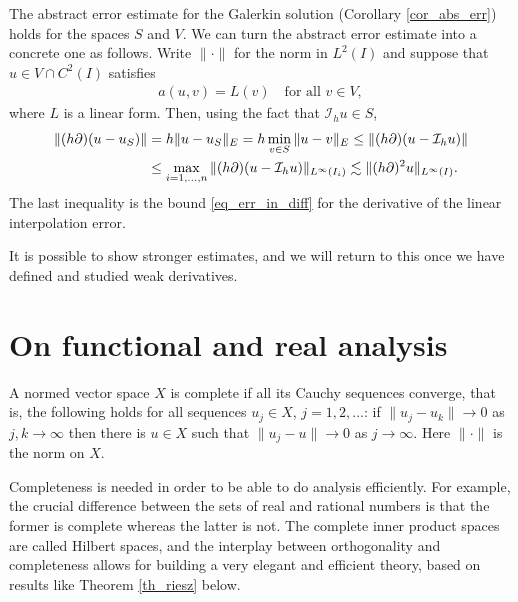 \documentclass[12pt,oneside,final]{amsart}
\def\I{\mathcal I}
\begin{document}
The abstract error estimate for the Galerkin solution (Corollary \ref{cor_abs_err}) holds for the spaces $S$ and $V$. 
We can turn the abstract error estimate into a concrete one as follows. Write $\|\cdot\|$ for the norm in $L^2(I)$ and suppose that $u \in V \cap C^2(I)$ satisfies
    \begin{align*}
a(u, v) = L(v) \quad \text{for all $v \in V$},
    \end{align*}
where $L$ is a linear form.
Then, using the fact that $\I_h u \in S$,
    \begin{align}\label{eq_err_peek}
\|(h\partial)(u-u_S)\|
&= 
h\|u-u_S\|_E 
= 
h \min_{v \in S}\|u-v\|_E
\le 
\|(h\partial)(u-\I_h u)\|
\\\notag&\le
\max_{i=1,\dots,n}\|(h\partial)(u - \I_h u)\|_{L^\infty(I_i)} 
\lesssim\|(h \partial)^2 u\|_{L^\infty(I)}.
    \end{align}
The last inequality is the bound \eqref{eq_err_in_diff} for the derivative of the linear interpolation error.

It is possible to show stronger estimates, and we will return to this once we have defined and studied weak derivatives. 

\section{On functional and real analysis}

\begin{definition}[Completeness]\label{def_complete}
A normed vector space $X$ is complete if all its Cauchy sequences converge, that is,
the following holds for all sequences $u_j \in X$, $j=1,2,\dots$: 
if $\|u_j - u_k\| \to 0$ as $j,k \to \infty$
then there is $u \in X$ such that $\|u_j - u\| \to 0$ as $j \to \infty$. Here $\|\cdot\|$ is the norm on $X$.
\end{definition}

Completeness is needed in order to be able to do analysis efficiently. For example, the crucial difference between the sets of real and rational numbers is that the former is complete whereas the latter is not. 
The complete inner product spaces are called Hilbert spaces,
and the interplay between orthogonality and completeness allows for building a very elegant and efficient theory, based on results like Theorem \ref{th_riesz} below.
\end{document}
